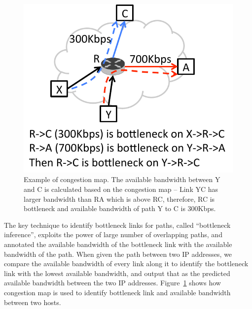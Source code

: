 \begin{figure}[h!]
\begin{center}
\includegraphics[scale=0.5] {figures/congestion_map.pdf}
\vspace{-0.4cm}
\caption{Example of congestion map. The available bandwidth between Y and C is calculated based on the congestion map -- Link YC has larger bandwidth than RA which is above RC, therefore, RC is bottleneck and available bandwidth of path Y to C is 300Kbps.}
\label{fig:idea:example}
\end{center}
\end{figure}

The key technique to identify bottleneck links for paths, called ``bottleneck
inference'', exploits the power of large number of overlapping paths,
and annotated the available bandwidth of the bottleneck link with the available
bandwidth of the path.  When given the path between two IP addresses, we
compare the available bandwidth of every link along it to identify the bottleneck link
with the lowest available bandwidth, and output that as the predicted available
bandwidth between the two IP addresses. Figure~\ref{fig:idea:example} shows how congestion map is used to identify bottleneck link and available bandwidth between two hosts.



